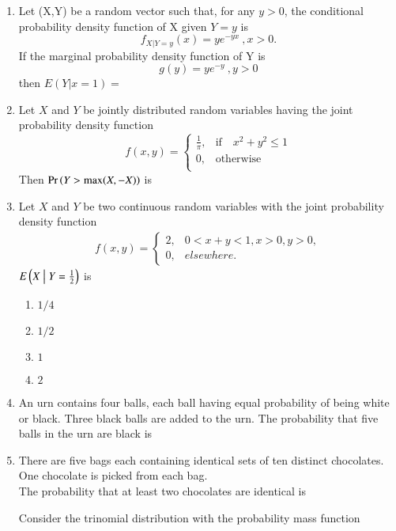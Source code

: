 \documentclass[journal,12pt,twocolumn]{IEEEtran}
\begin{document}
\begin{enumerate}
\solution

%
\item Let (X,Y) be a random vector such that, for any $y>0$, the conditional probability density function of X given $Y=y$ is $$f_{X|Y=y}(x)=ye^{-yx} \:,x>0. $$ If the marginal probability density function of Y is $$g(y)=ye^{-y}\:,y>0$$ then $E(Y|x=1)=$
\\
\solution

%
\item Let $X$ and $Y$ be jointly distributed random
variables having the joint probability
density function
\[
f(x,y) = \begin{cases}
            \frac{1}{\pi}, &\text{if}\quad x^2 + y^2 \leq 1\\
             0, &\text{otherwise}\\
            \end{cases}
\]
Then $\Pr\left(Y > \text{max}(X,-X)\right)$ is
\\
\solution 

%
\item Let $X$ and $Y$ be two continuous random variables with the joint probability density function
\begin{align}
    f(x,y) =
    \begin{cases}
    2, & 0<x+y<1, x>0, y>0,\\
    0, & elsewhere.
    \end{cases}
\end{align}
$E\left(X \bigm| Y=\frac{1}{2}\right)$ is
\begin{enumerate}
    \item $1/4$
    \item $1/2$
    \item $1$
    \item $2$
\end{enumerate}
\solution
%
%
\item An urn contains four balls, each ball having equal probability of being white or black. Three black balls are added to the urn. The probability that five balls in the urn are black is
\\
\solution

%
\item There are five bags each containing identical sets of ten distinct chocolates. One chocolate is picked from each bag.\\
The probability that at least two chocolates are identical is
%
\\
\solution

%
Consider the trinomial distribution with the probability mass function 

\end{enumerate}
\end{document}
